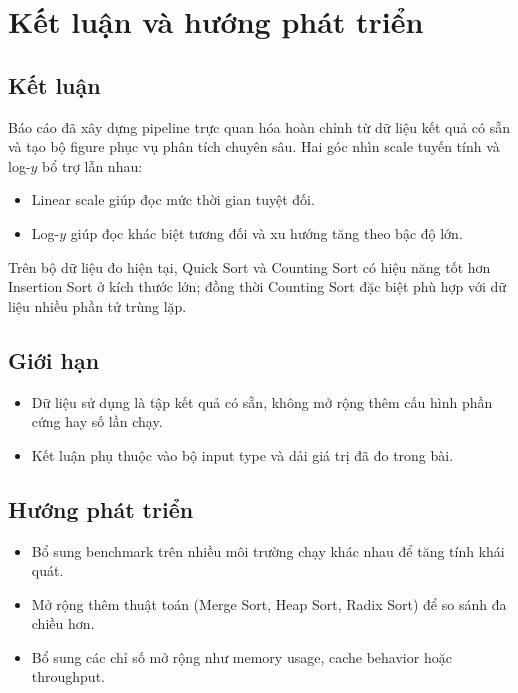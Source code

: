 \section{Kết luận và hướng phát triển}

\subsection{Kết luận}

Báo cáo đã xây dựng pipeline trực quan hóa hoàn chỉnh từ dữ liệu kết quả có sẵn và tạo bộ figure phục vụ phân tích chuyên sâu.
Hai góc nhìn scale tuyến tính và log-$y$ bổ trợ lẫn nhau:
\begin{itemize}[leftmargin=1.2cm]
    \item Linear scale giúp đọc mức thời gian tuyệt đối.
    \item Log-$y$ giúp đọc khác biệt tương đối và xu hướng tăng theo bậc độ lớn.
\end{itemize}

Trên bộ dữ liệu đo hiện tại, Quick Sort và Counting Sort có hiệu năng tốt hơn Insertion Sort ở kích thước lớn;
đồng thời Counting Sort đặc biệt phù hợp với dữ liệu nhiều phần tử trùng lặp.

\subsection{Giới hạn}

\begin{itemize}[leftmargin=1.2cm]
    \item Dữ liệu sử dụng là tập kết quả có sẵn, không mở rộng thêm cấu hình phần cứng hay số lần chạy.
    \item Kết luận phụ thuộc vào bộ input type và dải giá trị đã đo trong bài.
\end{itemize}

\subsection{Hướng phát triển}

\begin{itemize}[leftmargin=1.2cm]
    \item Bổ sung benchmark trên nhiều môi trường chạy khác nhau để tăng tính khái quát.
    \item Mở rộng thêm thuật toán (Merge Sort, Heap Sort, Radix Sort) để so sánh đa chiều hơn.
    \item Bổ sung các chỉ số mở rộng như memory usage, cache behavior hoặc throughput.
\end{itemize}
